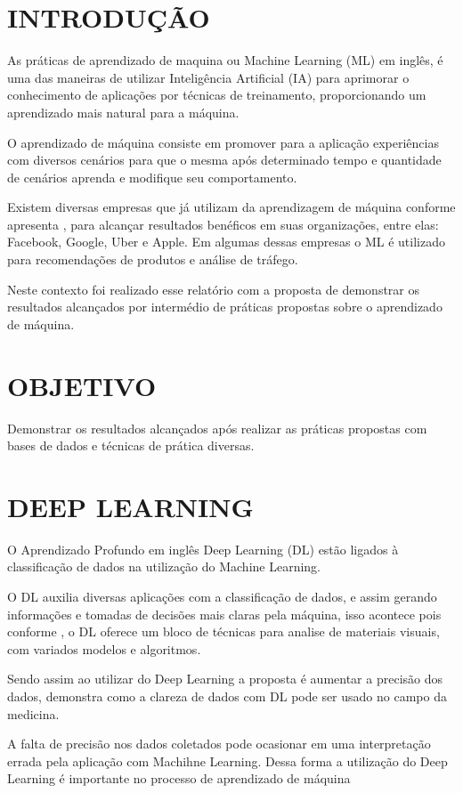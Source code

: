 \documentclass[a4paper, 12 pt, conference]{ieeeconf}  %
\begin{document}
\section{INTRODUÇÃO}
As práticas de aprendizado de maquina ou Machine Learning (ML) em inglês, é uma das maneiras de utilizar Inteligência Artificial (IA) para aprimorar o conhecimento de aplicações por técnicas de treinamento, proporcionando um aprendizado mais natural para a máquina.

O aprendizado de máquina consiste em promover para a aplicação experiências com diversos cenários para que o mesma após determinado tempo e quantidade de cenários aprenda e modifique seu comportamento.

Existem diversas empresas que já utilizam da aprendizagem de máquina conforme apresenta \cite{ray:2019}, para alcançar resultados benéficos em suas organizações, entre elas: Facebook, Google, Uber e Apple. Em algumas dessas empresas o ML é utilizado para recomendações de produtos e análise de tráfego.

Neste contexto foi realizado esse relatório com a proposta de demonstrar os resultados alcançados por intermédio de práticas propostas sobre o aprendizado de máquina.
\section{OBJETIVO}
Demonstrar os resultados alcançados após realizar as práticas propostas com bases de dados e técnicas de prática diversas.
\section{DEEP LEARNING}
O Aprendizado Profundo em inglês Deep Learning (DL) estão ligados à classificação de dados na utilização do Machine Learning.

O DL auxilia diversas aplicações com a classificação de dados, e assim gerando informações e tomadas de decisões mais claras pela máquina, isso acontece pois conforme \cite{ponti:2017}, o DL oferece um bloco de técnicas para analise de materiais visuais, com variados modelos e algoritmos.

Sendo assim ao utilizar do Deep Learning a proposta é aumentar a precisão dos dados, \cite{karatekin:2019} demonstra como a clareza de dados com DL pode ser usado no campo da medicina.

A falta de precisão nos dados coletados pode ocasionar em uma interpretação errada pela aplicação com Machihne Learning. Dessa forma a utilização do Deep Learning é importante no processo de aprendizado de máquina
\end{document}
